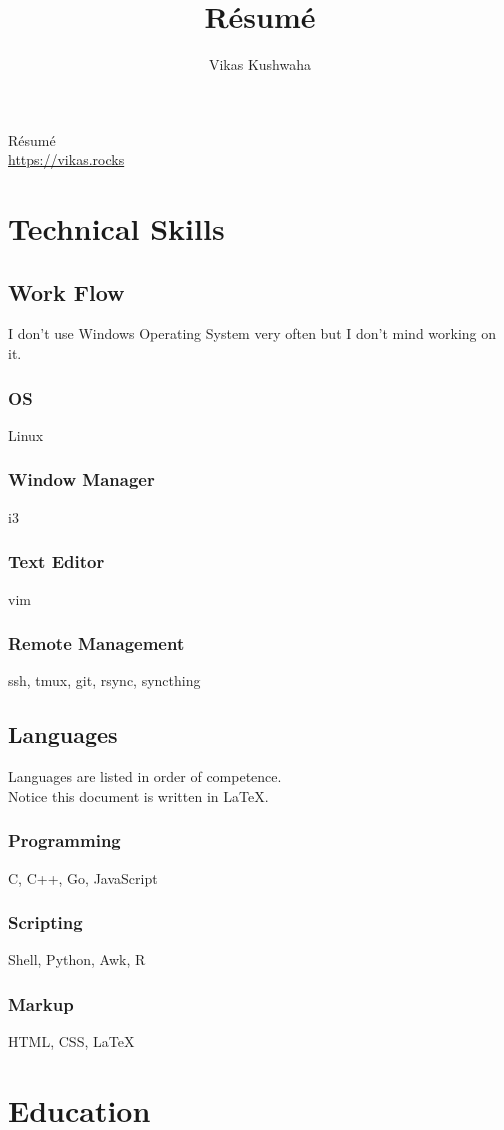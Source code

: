 \documentclass[14pt]{extarticle}
\title{R\'esum\'e}
\author{Vikas Kushwaha}
\renewcommand{\maketitle}{
	\begin{center}
		{\huge\bfseries
		\theauthor}

		\vspace{.25em}

		R\'esum\'e\\
		\url{https://vikas.rocks}
	\end{center}
}
\begin{document}
\maketitle


\section{Technical Skills}

\subsection{Work Flow}
I don't use Windows Operating System very often but I don't mind working on it.
\subsubsection{OS} Linux
\subsubsection{Window Manager} i3
\subsubsection{Text Editor} vim
\subsubsection{Remote Management} ssh, tmux, git, rsync, syncthing

\subsection{Languages}
Languages are listed in order of competence.\\
Notice this document is written in {\LaTeX}.
\subsubsection{Programming}
C, C++, Go, JavaScript
\subsubsection{Scripting}
Shell, Python, Awk, R
\subsubsection{Markup}
HTML, CSS, {\LaTeX}


\section{Education}
\end{document}
